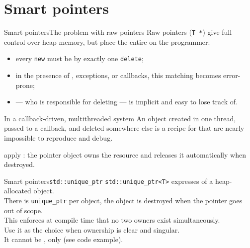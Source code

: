 
\section{Smart pointers}
\graphicspath{{figs/section3/}}

\begin{frame}{Smart pointers}{The problem with raw pointers}
	\justifying
	Raw pointers (\texttt{T *}) give full control over heap memory, but place the entire  on the programmer:
	\begin{itemize}
		\item every \texttt{new} must be  by exactly one \texttt{delete};
		\item in the presence of , exceptions, or callbacks, this matching becomes error-prone;
		\item {} — who is responsible for deleting — is implicit and easy to lose track of.
	\end{itemize}
	\begin{alertblock}{In a callback-driven, multithreaded system}
		\justifying
		An object created in one thread, passed to a callback, and deleted somewhere else is a recipe for  that are nearly impossible to reproduce and debug.
	\end{alertblock}
	 apply : the pointer object owns the resource and releases it automatically when destroyed.
\end{frame}
\begin{frame}{Smart pointers}{\texttt{std::unique\_ptr}}
	\justifying
	\texttt{std::unique\_ptr<T>} expresses  of a heap-allocated object.\\
  \bigskip
	There is  \texttt{unique\_ptr} per object, the object is destroyed when the pointer goes out of scope.\\
  \bigskip
	This enforces at compile time that no two owners exist simultaneously.\\
  \bigskip
	Use it as the  choice when ownership is clear and singular.\\
  \bigskip
  It cannot be , only  (see code example).
\end{frame}
